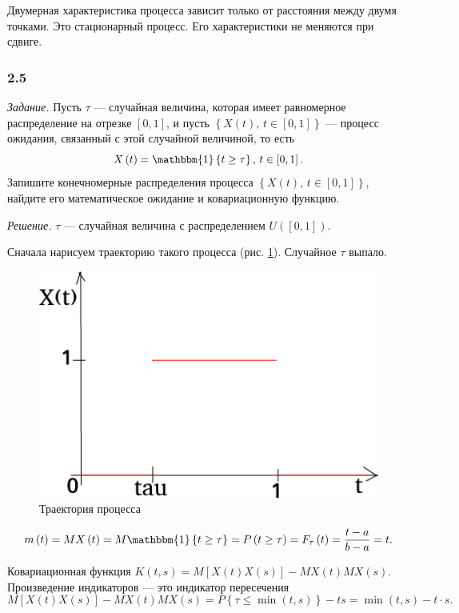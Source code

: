 Двумерная характеристика процесса зависит только от расстояния между двумя точками.
Это стационарный процесс.
Его характеристики не меняются при сдвиге.

\subsubsection*{2.5}

\textit{Задание.}
Пусть $ \tau $ --- случайная величина,
которая имеет равномерное распределение на отрезке $ \left[ 0, 1 \right] $,
и пусть $ \left\{ X \left( t \right), \, t \in \left[ 0, 1 \right] \right\} $ --- процесс ожидания,
связанный с этой случайной величиной, то есть
$$X \left( t \right) =
  \mathbbm{1} \left\{ t \geq \tau \right\}, \,
  t \in \left[ 0, 1 \right].$$
Запишите конечномерные распределения процесса
$ \left\{ X \left( t \right), \, t \in \left[ 0, 1 \right] \right\} $,
найдите его математическое ожидание и ковариационную функцию.

\textit{Решение.}
$ \tau $ --- случайная величина с распределением $U \left( \left[ 0 , 1 \right] \right) $.

Сначала нарисуем траекторию такого процесса (рис. \ref{fig:25}).
Случайное $ \tau $ выпало.

\begin{figure}[h!]
 \centering
 \includegraphics[width=.5\textwidth]{./pictures/2_5.png}
 \caption{Траектория процесса}
 \label{fig:25}
\end{figure}

$$m \left( t \right) =
  MX \left( t \right) =
  M \mathbbm{1} \left\{ t \geq \tau \right\} =
  P \left( t \geq \tau \right) =
  F_{ \tau } \left( t \right) =
  \frac{t - a}{b - a} =
  t.$$

Ковариационная функция
$K \left( t, s \right) =
  M \left[ X \left( t \right) X \left( s \right) \right] -
  MX \left( t \right) MX \left( s \right) $.
Произведение индикаторов --- это индикатор пересечения
$$M \left[ X \left( t \right) X \left( s \right) \right] -
  MX \left( t \right) MX \left( s \right) =
  P \left\{ \tau \leq \min \left( t, s \right) \right\} - ts =
  \min \left( t, s \right) - t \cdot s.$$

